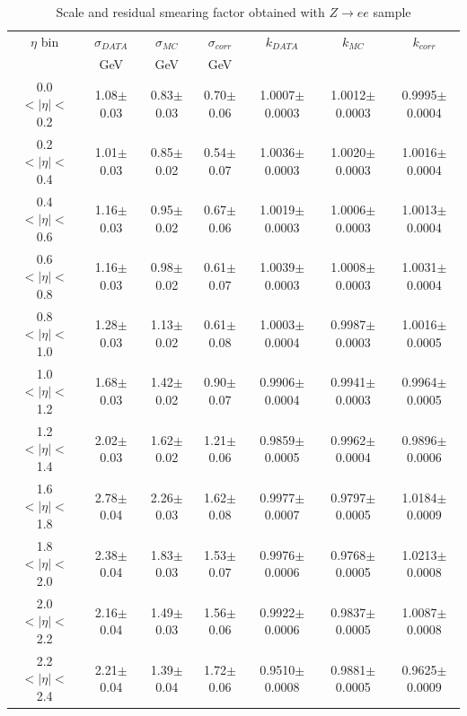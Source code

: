 \begin{table}[htb]
  \begin{center}
    \begin{tabular}{ccccccc}
$\eta$ bin & $\sigma_{DATA}$ &  $\sigma_{MC}$ & $\sigma_{corr}$ & $k_{DATA}$ &  $k_{MC}$ & $k_{corr}$ \\
&GeV &GeV &GeV & & & \\
\hline
0.0$<|\eta|<$0.2 &1.08$\pm$ 0.03 & 0.83$\pm$ 0.03 & 0.70$\pm$ 0.06 & 1.0007$\pm$ 0.0003 & 1.0012$\pm$ 0.0003 & 0.9995$\pm$ 0.0004 \\ 
0.2$<|\eta|<$0.4 &1.01$\pm$ 0.03 & 0.85$\pm$ 0.02 & 0.54$\pm$ 0.07 & 1.0036$\pm$ 0.0003 & 1.0020$\pm$ 0.0003 & 1.0016$\pm$ 0.0004 \\ 
0.4$<|\eta|<$0.6 &1.16$\pm$ 0.03 & 0.95$\pm$ 0.02 & 0.67$\pm$ 0.06 & 1.0019$\pm$ 0.0003 & 1.0006$\pm$ 0.0003 & 1.0013$\pm$ 0.0004 \\ 
0.6$<|\eta|<$0.8 &1.16$\pm$ 0.03 & 0.98$\pm$ 0.02 & 0.61$\pm$ 0.07 & 1.0039$\pm$ 0.0003 & 1.0008$\pm$ 0.0003 & 1.0031$\pm$ 0.0004 \\ 
0.8$<|\eta|<$1.0 &1.28$\pm$ 0.03 & 1.13$\pm$ 0.02 & 0.61$\pm$ 0.08 & 1.0003$\pm$ 0.0004 & 0.9987$\pm$ 0.0003 & 1.0016$\pm$ 0.0005 \\ 
1.0$<|\eta|<$1.2 &1.68$\pm$ 0.03 & 1.42$\pm$ 0.02 & 0.90$\pm$ 0.07 & 0.9906$\pm$ 0.0004 & 0.9941$\pm$ 0.0003 & 0.9964$\pm$ 0.0005 \\ 
1.2$<|\eta|<$1.4 &2.02$\pm$ 0.03 & 1.62$\pm$ 0.02 & 1.21$\pm$ 0.06 & 0.9859$\pm$ 0.0005 & 0.9962$\pm$ 0.0004 & 0.9896$\pm$ 0.0006 \\ 
1.6$<|\eta|<$1.8 &2.78$\pm$ 0.04 & 2.26$\pm$ 0.03 & 1.62$\pm$ 0.08 & 0.9977$\pm$ 0.0007 & 0.9797$\pm$ 0.0005 & 1.0184$\pm$ 0.0009 \\ 
1.8$<|\eta|<$2.0 &2.38$\pm$ 0.04 & 1.83$\pm$ 0.03 & 1.53$\pm$ 0.07 & 0.9976$\pm$ 0.0006 & 0.9768$\pm$ 0.0005 & 1.0213$\pm$ 0.0008 \\ 
2.0$<|\eta|<$2.2 &2.16$\pm$ 0.04 & 1.49$\pm$ 0.03 & 1.56$\pm$ 0.06 & 0.9922$\pm$ 0.0006 & 0.9837$\pm$ 0.0005 & 1.0087$\pm$ 0.0008 \\ 
2.2$<|\eta|<$2.4 &2.21$\pm$ 0.04 & 1.39$\pm$ 0.04 & 1.72$\pm$ 0.06 & 0.9510$\pm$ 0.0008 & 0.9881$\pm$ 0.0005 & 0.9625$\pm$ 0.0009 \\ 

    \end{tabular}
    \caption{\label{tab:ResCorr}Scale and residual smearing factor obtained with $Z\rightarrow ee$ sample}
  \end{center}
\end{table}

